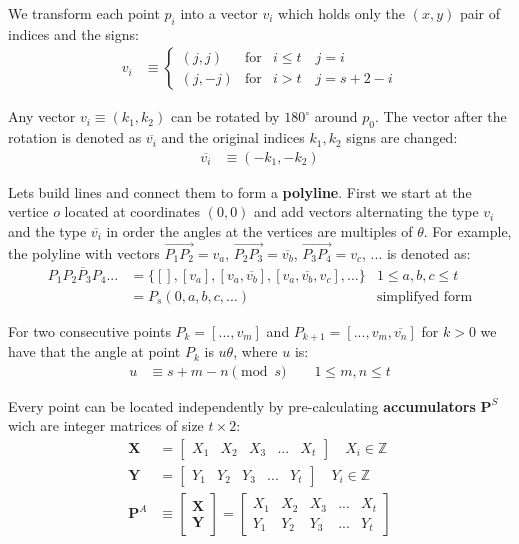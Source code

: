 \documentclass[11pt]{article}
\begin{document}
We transform each point $p_i$ into a vector $v_i$ which holds only the $(x,y)$ pair of indices and the signs:
\begin{align}
v_i &\equiv \left\{ \begin{array}{ccl}
 ( j, j ) & \mbox{for} & i \leq t \quad j = i\\
 ( j, -j ) & \mbox{for} & i > t \quad j = s+2-i
 \end{array}\right. \label{eq:vectors}
\end{align}

Any vector $v_i \equiv (k_1,k_2)$ can be rotated by $180^\circ$ around $p_0$. The vector after the rotation is denoted as $\overline{v_i}$ and the original indices $k_1,k_2$ signs are changed:
\begin{align}
\overline{v_i} &\equiv (-k_1, -k_2) \label{eq:vector180}
\end{align}

Lets build lines and connect them to form a \textbf{polyline}. First we start at the vertice $o$ located at coordinates $(0,0)$ and add vectors alternating the type $v_i$ and the type $\overline{v_i}$ in order the angles at the vertices are multiples of $\theta$. For example, the polyline with vectors $\overrightarrow{P_1P_2}=v_a$, $\overrightarrow{P_2P_3}=\overline{v_b}$, $\overrightarrow{P_3P_4}=v_c$, ... is denoted as:
\begin{align}
\overline{P_1P_2P_3P_4...} &= \{ [], [v_a], [v_a,\overline{v_b}],[v_a,\overline{v_b},v_c],... \} 
 & 1 \leq a,b,c \leq t \\
 &= P_s(0,a,b,c,...) & \mbox{simplifyed form}
\end{align}

For two consecutive points $P_k = [...,v_m]$ and $P_{k+1} = [...,v_m,\overline{v_n}]$ for $k>0$ we have that the angle at point $P_k$ is $u\theta$, where $u$ is:
\begin{align}
u &\equiv s + m - n \pmod{s} \quad  \quad 1 \leq m,n \leq t \label{eq:angle}
\end{align}

Every point can be located independently by pre-calculating \textbf{accumulators} $\textbf{P}^S$ wich are integer matrices of size $t\times 2$:
\begin{align}
\textbf{X} &= \left[\begin{array}{ccccc}X_1&X_2&X_3&...&X_t
 \end{array}\right]  \quad X_i \in \mathbb{Z}\\
\textbf{Y} &= \left[\begin{array}{ccccc}Y_1&Y_2&Y_3&...&Y_t
 \end{array}\right]  \quad Y_i \in \mathbb{Z}\\
\textbf{P}^A &\equiv \left[\begin{array}{c}\textbf{X} \\ \textbf{Y}
 \end{array}\right]
 = \left[\begin{array}{ccccc}X_1&X_2&X_3&...&X_t
  \\ Y_1&Y_2&Y_3&...&Y_t \end{array}\right] \label{eq:accums}
\end{align}
\end{document}
